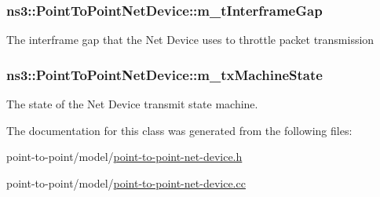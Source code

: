 \subsubsection[{\texorpdfstring{m\+\_\+t\+Interframe\+Gap}{m_tInterframeGap}}]{ ns3\+::\+Point\+To\+Point\+Net\+Device\+::m\+\_\+t\+Interframe\+Gap\hspace{0.3cm}{\ttfamily [private]}}\hypertarget{classns3_1_1PointToPointNetDevice_abb83cd1c35683a34deb50cb0e1bcf55d}{}\label{classns3_1_1PointToPointNetDevice_abb83cd1c35683a34deb50cb0e1bcf55d}
The interframe gap that the Net Device uses to throttle packet transmission 
\subsubsection[{\texorpdfstring{m\+\_\+tx\+Machine\+State}{m_txMachineState}}]{ ns3\+::\+Point\+To\+Point\+Net\+Device\+::m\+\_\+tx\+Machine\+State\hspace{0.3cm}{\ttfamily [private]}}\hypertarget{classns3_1_1PointToPointNetDevice_ad5896856f00b39aa0cc090f2e1a1e184}{}\label{classns3_1_1PointToPointNetDevice_ad5896856f00b39aa0cc090f2e1a1e184}
The state of the Net Device transmit state machine. 

The documentation for this class was generated from the following files\+:\begin{DoxyCompactItemize}
\item 
point-\/to-\/point/model/\hyperlink{point-to-point-net-device_8h}{point-\/to-\/point-\/net-\/device.\+h}\item 
point-\/to-\/point/model/\hyperlink{point-to-point-net-device_8cc}{point-\/to-\/point-\/net-\/device.\+cc}\end{DoxyCompactItemize}
